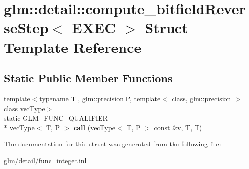\hypertarget{structglm_1_1detail_1_1compute__bitfieldReverseStep}{\section{glm\-:\-:detail\-:\-:compute\-\_\-bitfield\-Reverse\-Step$<$ E\-X\-E\-C $>$ Struct Template Reference}
\label{structglm_1_1detail_1_1compute__bitfieldReverseStep}
}
\subsection*{Static Public Member Functions}
\begin{DoxyCompactItemize}
\item 
\hypertarget{structglm_1_1detail_1_1compute__bitfieldReverseStep_ad7d43fd26b9390296e651f7a80e86aca}{{\footnotesize template$<$typename T , glm\-::precision P, template$<$ class, glm\-::precision $>$ class vec\-Type$>$ }\\static G\-L\-M\-\_\-\-F\-U\-N\-C\-\_\-\-Q\-U\-A\-L\-I\-F\-I\-E\-R \\*
vec\-Type$<$ T, P $>$ {\bfseries call} (vec\-Type$<$ T, P $>$ const \&v, T, T)}\label{structglm_1_1detail_1_1compute__bitfieldReverseStep_ad7d43fd26b9390296e651f7a80e86aca}

\end{DoxyCompactItemize}


The documentation for this struct was generated from the following file\-:\begin{DoxyCompactItemize}
\item 
glm/detail/\hyperlink{func__integer_8inl}{func\-\_\-integer.\-inl}\end{DoxyCompactItemize}
